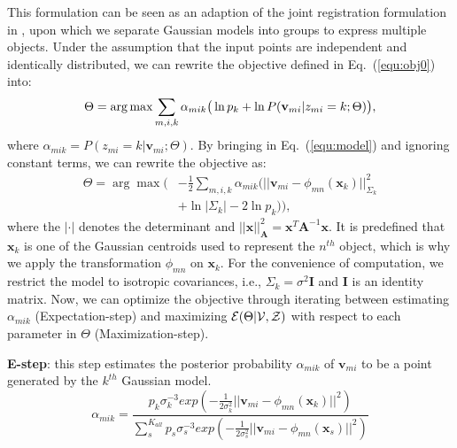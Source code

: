 This formulation can be seen as an adaption of the joint registration formulation in \cite{Evangelidis2014}, upon which we separate Gaussian models into groups to express multiple objects. 
%
%
Under the assumption that the input points are independent and identically distributed, we can rewrite the objective defined in Eq.~(\ref{equ:obj0}) into:
%
\begin{equation} \label{equ:obj2}
	\centering
\Theta=\arg\max\sum_{m,i,k}\alpha_{mik}\big(\ln p_k + \ln P(\mathbf{v}_{mi}|z_{mi}=k;\Theta)\big),
\end{equation}
%
where $\alpha_{mik} = P( z_{mi} = k | \mathbf{v}_{mi} ; \Theta )$.
%
By bringing in Eq.~(\ref{equ:model}) and ignoring constant terms, we can rewrite the objective as:
\begin{equation}
\label{equ:obj3}
\begin{aligned}
\Theta=\arg\max\Big(&-\frac{1}{2}\sum_{m,i,k}\alpha_{mik}\big(||\mathbf{v}_{mi}-\phi_{mn}(\mathbf{x}_k)||_{\Sigma_k}^2 \\&+ \ln |\Sigma_k| - 2\ln p_k\big)\Big),
\end{aligned}
\end{equation}
%
where the $|\cdot|$ denotes the determinant and $||\mathbf{x}||_{\mathbf{A}}^2= \mathbf{x}^T\mathbf{A}^{-1}\mathbf{x}$. 
%
It is predefined that $\mathbf{x}_k$ is one of the Gaussian centroids used to represent the $n^{th}$ object, which is why we apply the transformation $\phi_{mn}$ on $\mathbf{x}_k$. 
%
For the convenience of computation, we restrict the model to isotropic covariances, i.e., $\Sigma_k=\sigma^2\mathbf{I}$ and $\mathbf{I}$ is an identity matrix.
%
Now, we can optimize the objective through iterating between estimating $\alpha_{mik}$ (Expectation-step) and maximizing $\mathcal{E}(\Theta|\mathcal{V},\mathcal{Z})$ with respect to each parameter in $\Theta$ (Maximization-step).

\noindent\textbf{E-step}:
this step estimates the posterior probability $\alpha_{mik}$ of $\mathbf v_{mi}$ to be a point generated by the $k^{th}$ Gaussian model.
%
\begin{equation}
\label{equ:estep}
\alpha_{mik}=\frac{p_k\sigma_k^{-3}exp(-\frac{1}{2\sigma_k^2}||\mathbf v_{mi}-\phi_{mn}(\mathbf x_k)||^2)}{\sum_s^{K_{all}}p_s\sigma_s^{-3}exp(-\frac{1}{2\sigma_s^2}||\mathbf v_{mi}-\phi_{mn}(\mathbf x_s)||^2)}
\end{equation}
%

